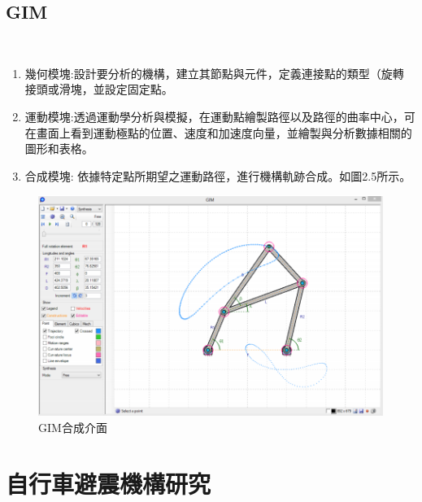 \documentclass[14pt,a4paper]{report}  %
\newcommand{\fourteen}{\fontsize{14pt}{\baselineskip}\selectfont}%
\begin{document}
{       \subsection{GIM}
       	\hspace*{\fill} \\        
        \fourteen {GIM是COMPMECH Research Group創建的註冊免費軟件，用於平面機構的運動模擬合成以及機械結構的靜態分析。GIM軟件具有三個主要模塊：幾何、運動、合成。}
        \begin{enumerate} 
       \item 幾何模塊:設計要分析的機構，建立其節點與元件，定義連接點的類型（旋轉
接頭或滑塊，並設定固定點。
       \item 運動模塊:透過運動學分析與模擬，在運動點繪製路徑以及路徑的曲率中心，可在畫面上看到運動極點的位置、速度和加速度向量，並繪製與分析數據相關的圖形和表格。
       \item 合成模塊: 依據特定點所期望之運動路徑，進行機構軌跡合成。如圖2.5所示。
       \end{enumerate}
        \begin{figure}[H]
        \centering
        \includegraphics[scale=0.8]{GIM.png} 
        \caption{GIM合成介面} 
        \label{fig:scale}
    	\end{figure}
      \newpage
      \section{自行車避震機構研究}
}
\end{document}
